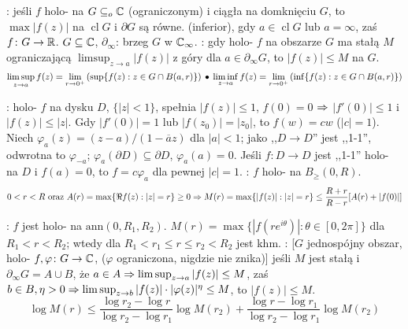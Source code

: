 :   jeśli $f$ holo- na $G \subseteq_o \mathbb{C}$ (ograniczonym) i ciągła na domknięciu $G$, to $\max |f(z)|$ na $\operatorname{cl} G$ i $\partial G$ są równe.
 (inferior), gdy $a \in \operatorname{cl} G$ lub $a = \infty$, zaś $f \colon G \to \mathbb{R}$.  %
 $G \subseteq \mathbb{C}$, $\partial_\infty$: brzeg $G$ w $\mathbb{C}_\infty$.
: gdy holo- $f$ na obszarze $G$ ma stałą $M$ ograniczającą $\limsup_{z\to a} |f(z)|$ z góry dla $a \in \partial_\infty G$, to $|f(z)| \le M$ na $G$.
\[
	\limsup_{z \to a} f(z) = \lim_{r \to 0^+} \left(\sup \{ f(z) : z \in G \cap B(a,r)\} \right) \, \bullet \,
	\liminf_{z \to a} f(z) = \lim_{r \to 0^+} \left(\inf \{ f(z) : z \in G \cap B(a,r)\} \right) 
\]

:  holo- $f$ na dysku $D$, $\{|z| <1\}$, spełnia $|f(z)| \le 1$, $f(0) = 0$ $\Rightarrow$ $|f'(0)| \le 1$ i $|f(z)| \le |z|$.
Gdy $|f'(0)| = 1$ lub $|f(z_0)| = |z_0|$, to $f(w) = cw$ ($|c| = 1$).
Niech $\varphi_a(z) = (z-a)/(1-\overline{a}z)$ dla $|a| <1$; jako ,,$D\to D$'' jest ,,1-1'', odwrotna to $\varphi_{-a}$; $\varphi_a(\partial D) \subseteq \partial D$, $\varphi_a(a) = 0$.
Jeśli $f \colon D \to D$ jest ,,1-1'' holo- na $D$ i $f(a) = 0$, to $f = c \varphi_a$ dla pewnej $|c| = 1$.
: $f$ holo- na $B_{\ge}(0, R)$.
\[
	0 < r < R \text { oraz } A(r) = \max \{\Re f(z) : |z| = r\}\ge 0 \Rightarrow 	M(r) = \max\{|f(z)| : |z| = r\} \le \frac{R+r}{R-r} [A(r) + |f(0)|]
\]

:  $f$ jest holo- na $\text{ann} (0, R_1, R_2)$.
$M(r) = \max \{|f(re^{i \theta})| : \theta \in [0, 2 \pi]\}$ dla $R_1 < r < R_2$; wtedy dla $R_1 < r_1 \le r \le r_2 < R_2$ jest khm.
: [$G$ jednospójny obszar, holo- $f, \varphi \colon G \to \mathbb{C}$, ($\varphi$ ograniczona, nigdzie nie znika)] jeśli $M$ jest stałą i $\partial_\infty G = A \cup B$, że $a \in A \Rightarrow \limsup_{z \to a} |f(z)| \le M$, zaś $b \in B, \eta > 0 \Rightarrow \limsup_{z \to b} |f(z)| \cdot |\varphi(z)|^\eta \le M$, to $|f(z)| \le M$.
\[
	\log M(r) \le \frac{\log r_2 - \log r}{\log r_2 - \log r_1} \log M(r_2) + \frac{\log r - \log r_1}{\log r_2 - \log r_1} \log M(r_2) 
\]
